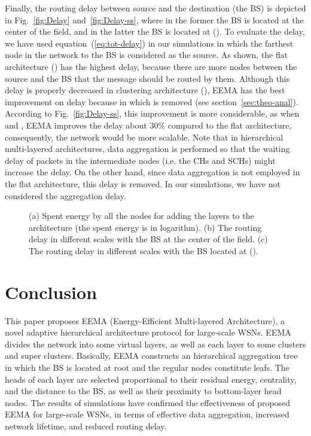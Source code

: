 \documentclass[journal]{IEEEtran}
\begin{document}
Finally, the routing delay between source and the destination (the BS) is depicted in Fig.~\ref{fig:Delay} and~\ref{fig:Delay-ss}, where in the former the BS is located at the center of the field, and in the latter the BS is located at ().
To evaluate the delay, we have used equation~(\ref{eq:tot-delay}) in our simulations in which the farthest node in the network to the BS is considered as the source.  As shown, the flat architecture () has the highest delay, because there are more nodes between the source and the BS that the message should be routed by them.  Although this delay is properly decreased in clustering architecture (),
EEMA has the best improvement on delay because in which  is removed (see section~\ref{sec:theo-anal}).  
According to Fig.~\ref{fig:Delay-ss}, this improvement is more considerable, as when  and , EEMA improves the delay about 30\% compared to the flat architecture, consequently,  the network would be more scalable.  Note that in hierarchical multi-layered architectures, data aggregation is performed so that the waiting delay of packets in the intermediate nodes (i.e. the CHs and SCHs) might increase the delay.  On the other hand, since data aggregation is not employed in the flat architecture, this delay is removed.  In our simulations, we have not considered the aggregation delay.
\begin{figure*}[t]
	\centering
	\caption[Optional caption for list of figures]{(a) Spent energy by all the nodes for adding the layers to the architecture (the spent energy is in logarithm). (b) The routing delay in different scales with the BS at the center of the field. (c) The routing delay in different scales with the BS located at ().}
	\label{fig:ene-del}
\end{figure*}

\section{Conclusion}
\label{sec:con}
This paper proposes EEMA (Energy-Efficient Multi-layered Architecture), a novel adaptive hierarchical architecture protocol for large-scale WSNs. EEMA divides the network into some virtual layers, as well as each layer to some clusters and super clusters. Basically, EEMA constructs an hierarchical aggregation tree in which the BS is located at root and the regular nodes constitute leafs.  The heads of each layer are selected proportional to their residual energy, centrality, and the distance to the BS, as well as their proximity to bottom-layer head nodes.  The results of simulations have confirmed the effectiveness of proposed EEMA for large-scale WSNs, in terms of effective data aggregation, increased network lifetime, and reduced routing delay.




\end{document}
